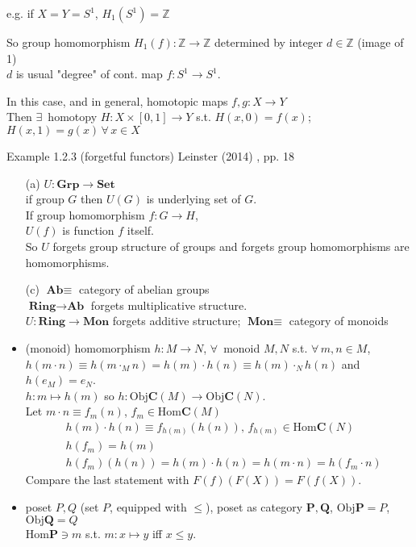 \documentclass[10pt]{amsart}
\begin{document}
\begin{multicols*}{2}
e.g. if $X=Y = S^1$, $H_1(S^1) = \mathbb{Z}$

So group homomorphism $H_1(f): \mathbb{Z} \to \mathbb{Z}$ determined by integer $d\in \mathbb{Z}$ (image of 1) \\
$d$ is usual "degree" of cont. map $f:S^1 \to S^1$. 

In this case, and in general, homotopic maps $f,g : X \to Y$ \\
Then $\exists \,$ homotopy $H:X \times [0,1] \to Y$ s.t. $H(x,0) = f(x)$; $H(x,1) = g(x) \, \forall \, x \in X$




Example 1.2.3 (forgetful functors) Leinster (2014) \cite{Lein2014}, pp. 18

\begin{enumerate}
	\item[(a)] $U : \textbf{Grp} \to \textbf{Set}$ \\
	if group $G$ then $U(G)$ is underlying set of $G$. \\
	If group homomorphism $f:G \to H$, \\
	$U(f)$ is function $f$ itself. \\
	So $U$ forgets group structure of groups and forgets group homomorphisms are homomorphisms.
	\item[(c)] $\textbf{Ab} \equiv $ category of abelian groups \\
	$\textbf{Ring} \to \textbf{Ab}$ forgets multiplicative structure. \\
	$U:\textbf{Ring} \to \textbf{Mon}$ forgets additive structure; $\textbf{Mon} \equiv $ category of monoids
\end{enumerate}




\begin{itemize}
	\item (monoid) homomorphism $h: M \to N$, $\forall \, $ monoid $M, N$ s.t. $\forall \, m,n \in M$, \\
	$h(m\cdot n) \equiv h(m\cdot_M n) = h(m) \cdot h(n) \equiv h(m) \cdot_N h(n)$ and \\
	$h(e_M) = e_N$. \\
	
	$h:m \mapsto h(m)$ so $h: \text{Obj}\mathbf{C}(M) \to \text{Obj}\mathbf{C}(N)$. \\
	Let $m\cdot n \equiv f_m(n)$, $f_m \in \text{Hom}\mathbf{C}(M)$
	\[
	\begin{aligned}
		& h(m) \cdot h(n) \equiv f_{h(m)}(h(n)), \, f_{h(m)} \in \text{Hom}\mathbf{C}(N) \\
 		& h(f_m) = h(m) \\
		& h(f_m)(h(n)) = h(m)\cdot h(n) = h(m\cdot n) = h(f_m\cdot n)
	\end{aligned}
	\]
	Compare the last statement with $F(f)(F(X)) = F(f(X))$.
	\item poset $P, Q$ (set $P$, equipped with $\leq$), poset as category $\mathbf{P}, \mathbf{Q}$, $\text{Obj}\mathbf{P} = P$, $\text{Obj}\mathbf{Q} = Q$ \\
	$\text{Hom}\mathbf{P} \ni m$ s.t. $m:x \mapsto y$ iff $x\leq y$. \\
	

\end{itemize}
\end{multicols*}
\end{document}
